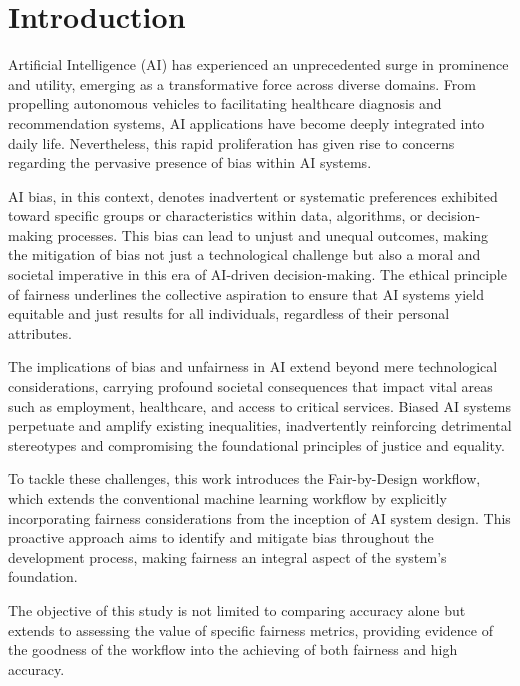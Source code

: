 \chapter{Introduction}
\label{chap:introduction}

Artificial Intelligence (AI) has experienced an unprecedented surge in prominence and utility, emerging as a transformative force across diverse domains. From propelling autonomous vehicles to facilitating healthcare diagnosis and recommendation systems, AI applications have become deeply integrated into daily life. Nevertheless, this rapid proliferation has given rise to concerns regarding the pervasive presence of bias within AI systems.

AI bias, in this context, denotes inadvertent or systematic preferences exhibited toward specific groups or characteristics within data, algorithms, or decision-making processes. This bias can lead to unjust and unequal outcomes, making the mitigation of bias not just a technological challenge but also a moral and societal imperative in this era of AI-driven decision-making. The ethical principle of fairness underlines the collective aspiration to ensure that AI systems yield equitable and just results for all individuals, regardless of their personal attributes.

The implications of bias and unfairness in AI extend beyond mere technological considerations, carrying profound societal consequences that impact vital areas such as employment, healthcare, and access to critical services. Biased AI systems perpetuate and amplify existing inequalities, inadvertently reinforcing detrimental stereotypes and compromising the foundational principles of justice and equality.

To tackle these challenges, this work introduces the Fair-by-Design workflow, which extends the conventional machine learning workflow by explicitly incorporating fairness considerations from the inception of AI system design. This proactive approach aims to identify and mitigate bias throughout the development process, making fairness an integral aspect of the system's foundation.

The objective of this study is not limited to comparing accuracy alone but extends to assessing the value of specific fairness metrics, providing evidence of the goodness of the workflow into the achieving of both fairness and high accuracy.

